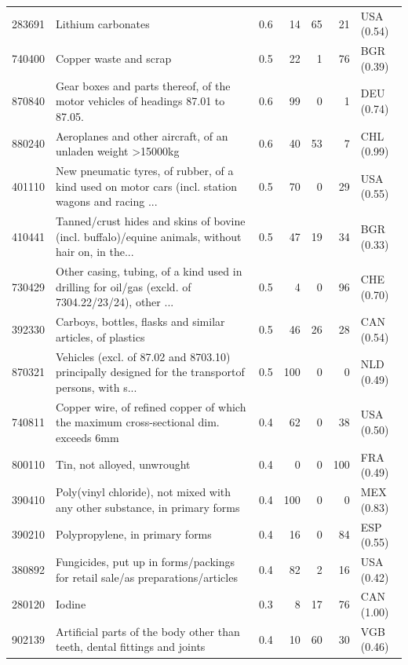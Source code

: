 \begin{tabular}{@{}l p{6.4cm} r r r r l@{}}
283691 & Lithium carbonates & 0.6 & 14 & 65 & 21 & USA (0.54) \\
740400 & Copper waste and scrap & 0.5 & 22 & 1 & 76 & BGR (0.39) \\
870840 & Gear boxes and parts thereof, of the motor vehicles of headings 87.01 to 87.05. & 0.6 & 99 & 0 & 1 & DEU (0.74) \\
880240 & Aeroplanes and other aircraft, of an unladen weight >15000kg & 0.6 & 40 & 53 & 7 & CHL (0.99) \\
401110 & New pneumatic tyres, of rubber, of a kind used on motor cars (incl. station wagons and racing ... & 0.5 & 70 & 0 & 29 & USA (0.55) \\
410441 & Tanned/\allowbreak{}crust hides and skins of bovine (incl. buffalo)/\allowbreak{}equine animals, without hair on, in the... & 0.5 & 47 & 19 & 34 & BGR (0.33) \\
730429 & Other casing, tubing, of a kind used in drilling for oil/\allowbreak{}gas (excld. of 7304.22/\allowbreak{}23/\allowbreak{}24), other ... & 0.5 & 4 & 0 & 96 & CHE (0.70) \\
392330 & Carboys, bottles, flasks and similar articles, of plastics & 0.5 & 46 & 26 & 28 & CAN (0.54) \\
870321 & Vehicles (excl. of 87.02 and 8703.10) principally designed for the transportof persons, with s... & 0.5 & 100 & 0 & 0 & NLD (0.49) \\
740811 & Copper wire, of refined copper of which the maximum cross-sectional dim. exceeds 6mm & 0.4 & 62 & 0 & 38 & USA (0.50) \\
800110 & Tin, not alloyed, unwrought & 0.4 & 0 & 0 & 100 & FRA (0.49) \\
390410 & Poly(vinyl chloride), not mixed with any other substance, in primary forms & 0.4 & 100 & 0 & 0 & MEX (0.83) \\
390210 & Polypropylene, in primary forms & 0.4 & 16 & 0 & 84 & ESP (0.55) \\
380892 & Fungicides, put up in forms/\allowbreak{}packings for retail sale/\allowbreak{}as preparations/\allowbreak{}articles  & 0.4 & 82 & 2 & 16 & USA (0.42) \\
280120 & Iodine & 0.3 & 8 & 17 & 76 & CAN (1.00) \\
902139 & Artificial parts of the body other than teeth, dental fittings and joints & 0.4 & 10 & 60 & 30 & VGB (0.46) \\
\bottomrule
\end{tabular}
